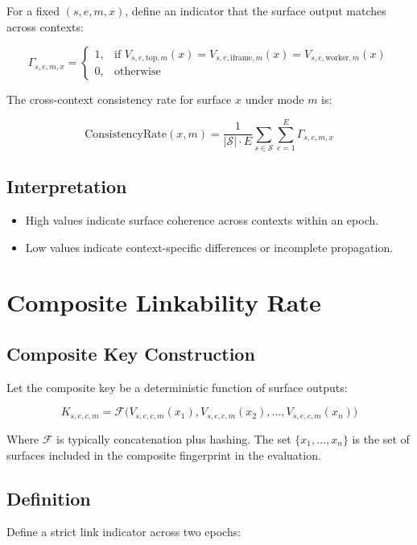 \documentclass[11pt]{report}
\begin{document}
For a fixed $(s,e,m,x)$, define an indicator that the surface output matches across contexts:

\[
\Gamma_{s,e,m,x} =
\begin{cases}
1, & \text{if } V_{s,e,\text{top},m}(x) = V_{s,e,\text{iframe},m}(x) = V_{s,e,\text{worker},m}(x) \\
0, & \text{otherwise}
\end{cases}
\]

The cross-context consistency rate for surface $x$ under mode $m$ is:

\[
\text{ConsistencyRate}(x,m) =
\frac{1}{|\mathcal{S}| \cdot E}
\sum_{s \in \mathcal{S}} \sum_{e=1}^{E}
\Gamma_{s,e,m,x}
\]

\subsection{Interpretation}

\begin{itemize}
    \item High values indicate surface coherence across contexts within an epoch.
    \item Low values indicate context-specific differences or incomplete propagation.
\end{itemize}

\section{Composite Linkability Rate}

\subsection{Composite Key Construction}

Let the composite key be a deterministic function of surface outputs:

\[
K_{s,e,c,m} = \mathcal{F}\Big(
V_{s,e,c,m}(x_1), V_{s,e,c,m}(x_2), \dots, V_{s,e,c,m}(x_n)
\Big)
\]

Where $\mathcal{F}$ is typically concatenation plus hashing. The set $\{x_1,\dots,x_n\}$ is the set of surfaces included in the composite fingerprint in the evaluation.

\subsection{Definition}

Define a strict link indicator across two epochs:
\end{document}
